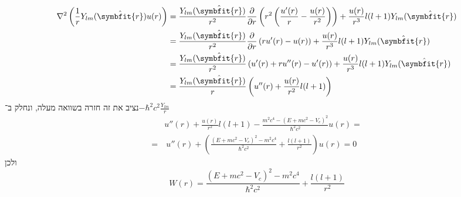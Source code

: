 \documentclass{article}
\begin{document}
\begin{align*}
\nabla^2\left(\frac{1}{r}Y_{lm}(\hat{\symbfit{r}})u(r)\right)
    &= \frac{Y_{lm}(\hat{\symbfit{r}})}{r^{2}}\frac{\partial}{\partial r}\left(r^{2}\left(\frac{u'(r)}{r}-\frac{u(r)}{r^2}\right)\right) + \frac{u(r)}{r^3}l(l+1)Y_{lm}(\hat{\symbfit{r}})\\
    &= \frac{Y_{lm}(\hat{\symbfit{r}})}{r^{2}}\frac{\partial}{\partial r}\left(ru'(r)-u(r)\right) + \frac{u(r)}{r^3}l(l+1)Y_{lm}(\hat{\symbfit{r}})\\
    &= \frac{Y_{lm}(\hat{\symbfit{r}})}{r^{2}}\left(u'(r)+ru''(r)-u'(r)\right) + \frac{u(r)}{r^3}l(l+1)Y_{lm}(\hat{\symbfit{r}})\\
    &= \frac{Y_{lm}(\hat{\symbfit{r}})}{r}\left(u''(r) + \frac{u(r)}{r^2}l(l+1)\right)
\end{align*}
נציב את זה חזרה בשוואה מעלה, ונחלק ב־$-\hbar^2c^2\frac{Y_{lm}}{r}$
\begin{align*}
    &u''(r) + \frac{u(r)}{r^2}l(l+1) - \frac{m^2 c^4 - {\left(E + mc^2-V_c\right)}^2}{\hbar^2c^2}u(r) = \\
    =&\ u''(r) + \left(\frac{{\left(E + mc^2-V_c\right)}^2 - m^2 c^4}{\hbar^2c^2} + \frac{l(l+1)}{r^2}\right)u(r) = 0
\end{align*}
ולכן
$$W(r)=\frac{{\left(E + mc^2-V_c\right)}^2 - m^2 c^4}{\hbar^2c^2} + \frac{l(l+1)}{r^2}$$
\end{document}
